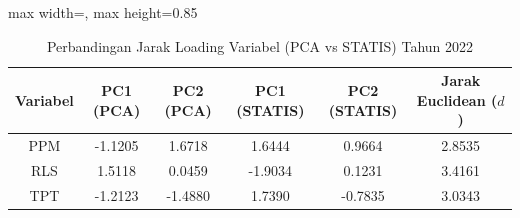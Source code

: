 \begin{table}[H]
\centering
\caption{Perbandingan Jarak Loading Variabel (PCA vs STATIS) Tahun 2022} \label{tab:samplejarak_loading_2022}
\begin{adjustbox}{max width=\textwidth, max height=0.85\textheight}
\begin{tabular}{|c|c|c|c|c|c|}
\hline
\textbf{Variabel} & \textbf{PC1 (PCA)} & \textbf{PC2 (PCA)} & \textbf{PC1 (STATIS)} & \textbf{PC2 (STATIS)} & \textbf{Jarak Euclidean ($d$)} \\
\hline
PPM & -1.1205 & 1.6718 & 1.6444 & 0.9664 & 2.8535 \\
RLS & 1.5118 & 0.0459 & -1.9034 & 0.1231 & 3.4161 \\
TPT & -1.2123 & -1.4880 & 1.7390 & -0.7835 & 3.0343 \\
\hline
\end{tabular}
\end{adjustbox}
\end{table}
